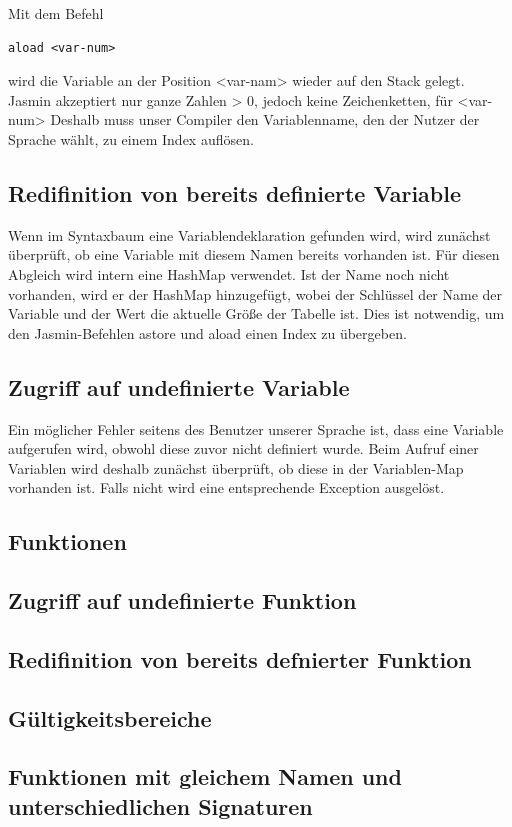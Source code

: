 \documentclass[12pt, a4paper, oneside, ngerman]{article}
\begin{document}
Mit dem Befehl
\begin{lstlisting}[frame=single]
aload <var-num>
\end{lstlisting}
wird die Variable an der Position <var-nam> wieder auf den Stack gelegt. 
Jasmin akzeptiert nur ganze Zahlen > 0, jedoch keine Zeichenketten, für <var-num>
Deshalb muss unser Compiler den Variablenname, den der Nutzer der Sprache wählt, zu einem Index auflösen.

\subsection*{Redifinition von bereits definierte Variable}
Wenn im Syntaxbaum eine Variablendeklaration gefunden wird, wird zunächst überprüft, ob eine Variable mit diesem Namen bereits vorhanden ist. Für diesen Abgleich wird intern eine HashMap verwendet. Ist der Name noch nicht vorhanden, wird er der HashMap hinzugefügt, wobei der Schlüssel der Name der Variable und der Wert die aktuelle Größe der Tabelle ist. Dies ist notwendig, um den Jasmin-Befehlen astore und aload einen Index  zu übergeben.

\subsection*{Zugriff auf undefinierte Variable}
Ein möglicher Fehler seitens des Benutzer unserer Sprache ist, dass eine Variable aufgerufen wird, obwohl diese zuvor nicht definiert wurde. Beim Aufruf einer Variablen wird deshalb zunächst überprüft, ob diese in der Variablen-Map vorhanden ist. Falls nicht wird eine entsprechende Exception ausgelöst.


\subsection{Funktionen}
\subsection*{Zugriff auf undefinierte Funktion}
\subsection*{Redifinition von bereits defnierter Funktion}
\subsection*{Gültigkeitsbereiche}
\subsection*{Funktionen mit gleichem Namen und unterschiedlichen Signaturen}
\end{document}
